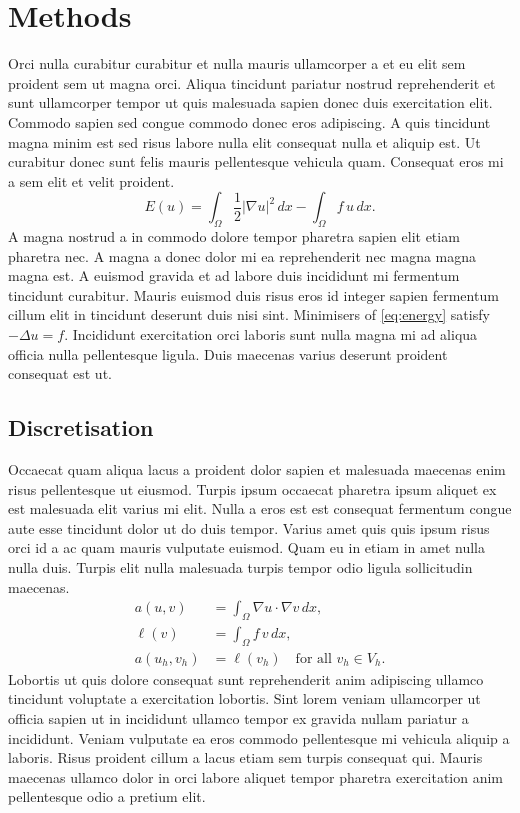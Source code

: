 \section{Methods}
\label{sec:methods}
Orci nulla curabitur curabitur et nulla mauris ullamcorper a et eu elit
sem proident sem ut magna orci. Aliqua tincidunt pariatur nostrud
reprehenderit et sunt ullamcorper tempor ut quis malesuada sapien donec
duis exercitation elit. Commodo sapien sed congue commodo donec eros
adipiscing. A quis tincidunt magna minim est sed risus labore nulla elit
consequat nulla et aliquip est. Ut curabitur donec sunt felis mauris
pellentesque vehicula quam. Consequat eros mi a sem elit et velit
proident.
\begin{equation}
  \label{eq:energy}
  E(u) = \int_\Omega \frac{1}{2} \lvert \nabla u \rvert^2 \, dx
         - \int_\Omega f\, u \, dx .
\end{equation}
A magna nostrud a in commodo dolore tempor pharetra sapien elit etiam
pharetra nec. A magna a donec dolor mi ea reprehenderit nec magna magna
magna est. A euismod gravida et ad labore duis incididunt mi fermentum
tincidunt curabitur. Mauris euismod duis risus eros id integer sapien
fermentum cillum elit in tincidunt deserunt duis nisi sint. Minimisers
of \eqref{eq:energy} satisfy $-\Delta u = f$. Incididunt exercitation
orci laboris sunt nulla magna mi ad aliqua officia nulla pellentesque
ligula. Duis maecenas varius deserunt proident consequat est ut.

\subsection{Discretisation}
Occaecat quam aliqua lacus a proident dolor sapien et malesuada maecenas
enim risus pellentesque ut eiusmod. Turpis ipsum occaecat pharetra ipsum
aliquet ex est malesuada elit varius mi elit. Nulla a eros est est
consequat fermentum congue aute esse tincidunt dolor ut do duis tempor.
Varius amet quis quis ipsum risus orci id a ac quam mauris vulputate
euismod. Quam eu in etiam in amet nulla nulla duis. Turpis elit nulla
malesuada turpis tempor odio ligula sollicitudin maecenas.
\begin{align}
  a(u, v) &= \int_\Omega \nabla u \cdot \nabla v \, dx, \\
  \ell(v) &= \int_\Omega f\, v \, dx, \\
  a(u_h, v_h) &= \ell(v_h) \quad \text{for all } v_h \in V_h .
\end{align}
Lobortis ut quis dolore consequat sunt reprehenderit anim adipiscing
ullamco tincidunt voluptate a exercitation lobortis. Sint lorem veniam
ullamcorper ut officia sapien ut in incididunt ullamco tempor ex gravida
nullam pariatur a incididunt. Veniam vulputate ea eros commodo
pellentesque mi vehicula aliquip a laboris. Risus proident cillum a
lacus etiam sem turpis consequat qui. Mauris maecenas ullamco dolor in
orci labore aliquet tempor pharetra exercitation anim pellentesque odio
a pretium elit.

